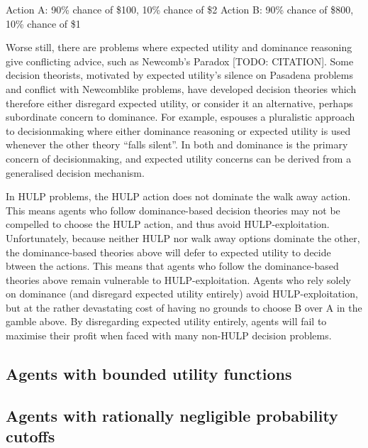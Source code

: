 \documentclass{article}
\begin{document}
\begin{center}
Action A: 90\% chance of \$100, 10\% chance of \$2
Action B: 90\% chance of \$800, 10\% chance of \$1
\end{center}

Worse still, there are problems where expected utility and dominance reasoning give conflicting advice, such as Newcomb's Paradox [TODO: CITATION]. Some decision theorists, motivated by expected utility's silence on Pasadena problems and conflict with Newcomblike problems, have developed decision theories which therefore either disregard expected utility, or consider it an alternative, perhaps subordinate concern to dominance. For example, \citep{colyvan2006no} espouses a pluralistic approach to decisionmaking where either dominance reasoning or expected utility is used whenever the other theory ``falls silent''. In both \citep{easwaran2009dominance} and \citep{colyvan2008relative} dominance is the primary concern of decisionmaking, and expected utility concerns can be derived from a generalised decision mechanism.

In HULP problems, the HULP action does not dominate the walk away action. This means agents who follow dominance-based decision theories may not be compelled to choose the HULP action, and thus avoid HULP-exploitation. Unfortunately, because neither HULP nor walk away options dominate the other, the dominance-based theories above will defer to expected utility to decide btween the actions. This means that agents who follow the dominance-based theories above remain vulnerable to HULP-exploitation. Agents who rely solely on dominance (and disregard expected utility entirely) avoid HULP-exploitation, but at the rather devastating cost of having no grounds to choose B over A in the gamble above. By disregarding expected utility entirely, agents will fail to maximise their profit when faced with many non-HULP decision problems.

\subsection{Agents with bounded utility functions}
\subsection{Agents with rationally negligible probability cutoffs}



\end{document}
